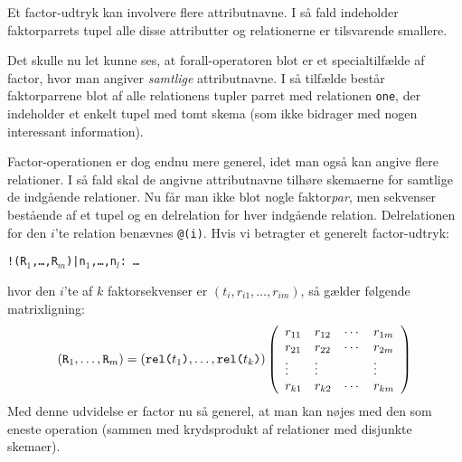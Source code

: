 \documentclass{article}
\newcounter{eks}
\begin{document}
Et factor-udtryk kan involvere flere attributnavne. I s\aa{} fald indeholder
faktorparrets tupel alle disse attributter og relationerne er tilsvarende
smallere. 


Det skulle nu let kunne ses, at forall-operatoren blot er et specialtilf\ae{}lde
af factor, hvor man angiver {\em samtlige\/} attributnavne. I s\aa{} tilf\ae{}lde
best\aa{}r faktorparrene blot af alle relationens tupler parret med
relationen \verb"one", der indeholder et enkelt tupel med tomt skema
(som ikke bidrager med nogen interessant information).

Factor-operationen er dog endnu mere generel, idet man ogs\aa{} kan angive
flere relationer. I s\aa{} fald skal de angivne attributnavne tilh\o{}re
skemaerne for samtlige de indg\aa{}ende relationer. Nu f\aa{}r man ikke blot
nogle faktor{\em par}, men sekvenser best\aa{}ende af et tupel og en delrelation for
hver indg\aa{}ende relation. Delrelationen for den $i$'te relation ben\ae{}vnes
\verb"@(i)". Hvis vi betragter et generelt factor-udtryk:
\begin{center}
{\tt !(R$_1$,\ldots,R$_m$)|n$_1$,\ldots,n$_l$: \ldots}
\end{center}
hvor den $i$'te af $k$ faktorsekvenser er $(t_i,r_{i1},\ldots,r_{im})$, s\aa{}
g\ae{}lder f\o{}lgende matrixligning:
$$ (\mbox{\tt R}_1,\ldots,\mbox{\tt R}_m) = 
   (\mbox{\tt rel(}t_1\mbox{\tt )},\ldots,\mbox{\tt rel(}t_k\mbox{\tt )})
   \left(\begin{array}{llll}
   r_{11} & r_{12} & \cdots & r_{1m} \\
   r_{21} & r_{22} & \cdots & r_{2m} \\
   \vdots & \vdots & & \vdots \\
   r_{k1} & r_{k2} & \cdots & r_{km} 
   \end{array}\right)
$$
Med denne udvidelse er factor nu s\aa{} generel, at man kan n\o{}jes med
den som eneste operation (sammen med krydsprodukt af relationer med
disjunkte skemaer).
\end{document}
